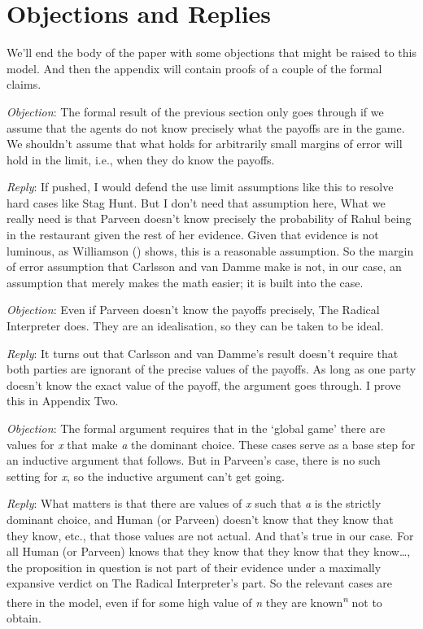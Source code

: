 \documentclass[
  11pt,
  letterpaper,
  DIV=11,
  numbers=noendperiod,
  twoside]{scrartcl}
\begin{document}
\section{Objections and Replies}\label{objectionsandreplies}

We'll end the body of the paper with some objections that might be
raised to this model. And then the appendix will contain proofs of a
couple of the formal claims.

\emph{Objection}: The formal result of the previous section only goes
through if we assume that the agents do not know precisely what the
payoffs are in the game. We shouldn't assume that what holds for
arbitrarily small margins of error will hold in the limit, i.e., when
they do know the payoffs.

\emph{Reply}: If pushed, I would defend the use limit assumptions like
this to resolve hard cases like Stag Hunt. But I don't need that
assumption here, What we really need is that Parveen doesn't know
precisely the probability of Rahul being in the restaurant given the
rest of her evidence. Given that evidence is not luminous, as Williamson
() shows, this is a reasonable
assumption. So the margin of error assumption that Carlsson and van
Damme make is not, in our case, an assumption that merely makes the math
easier; it is built into the case.

\emph{Objection}: Even if Parveen doesn't know the payoffs precisely,
The Radical Interpreter does. They are an idealisation, so they can be
taken to be ideal.

\emph{Reply}: It turns out that Carlsson and van Damme's result doesn't
require that both parties are ignorant of the precise values of the
payoffs. As long as one party doesn't know the exact value of the
payoff, the argument goes through. I prove this in Appendix Two.

\emph{Objection}: The formal argument requires that in the `global game'
there are values for \emph{x} that make \emph{a} the dominant choice.
These cases serve as a base step for an inductive argument that follows.
But in Parveen's case, there is no such setting for \emph{x}, so the
inductive argument can't get going.

\emph{Reply}: What matters is that there are values of \emph{x} such
that \emph{a} is the strictly dominant choice, and Human (or Parveen)
doesn't know that they know that they know, etc., that those values are
not actual. And that's true in our case. For all Human (or Parveen)
knows that they know that they know that they know\ldots, the
proposition in question is not part of their evidence under a maximally
expansive verdict on The Radical Interpreter's part. So the relevant
cases are there in the model, even if for some high value of \emph{n}
they are known\textsuperscript{\emph{n}} not to obtain.
\end{document}
